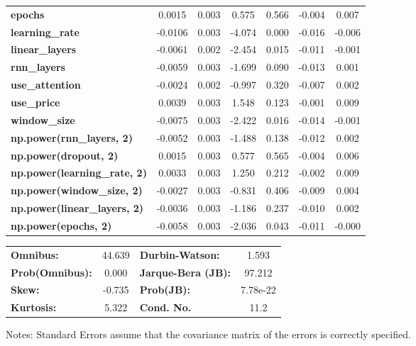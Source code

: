 \begin{center}
\begin{tabular}{lcccccc}
\textbf{epochs}                            &       0.0015  &        0.003     &     0.575  &         0.566        &       -0.004    &        0.007     \\
\textbf{learning\_rate}                    &      -0.0106  &        0.003     &    -4.074  &         0.000        &       -0.016    &       -0.006     \\
\textbf{linear\_layers}                    &      -0.0061  &        0.002     &    -2.454  &         0.015        &       -0.011    &       -0.001     \\
\textbf{rnn\_layers}                       &      -0.0059  &        0.003     &    -1.699  &         0.090        &       -0.013    &        0.001     \\
\textbf{use\_attention}                    &      -0.0024  &        0.002     &    -0.997  &         0.320        &       -0.007    &        0.002     \\
\textbf{use\_price}                        &       0.0039  &        0.003     &     1.548  &         0.123        &       -0.001    &        0.009     \\
\textbf{window\_size}                      &      -0.0075  &        0.003     &    -2.422  &         0.016        &       -0.014    &       -0.001     \\
\textbf{np.power(rnn\_layers, 2)}          &      -0.0052  &        0.003     &    -1.488  &         0.138        &       -0.012    &        0.002     \\
\textbf{np.power(dropout, 2)}              &       0.0015  &        0.003     &     0.577  &         0.565        &       -0.004    &        0.006     \\
\textbf{np.power(learning\_rate, 2)}       &       0.0033  &        0.003     &     1.250  &         0.212        &       -0.002    &        0.009     \\
\textbf{np.power(window\_size, 2)}         &      -0.0027  &        0.003     &    -0.831  &         0.406        &       -0.009    &        0.004     \\
\textbf{np.power(linear\_layers, 2)}       &      -0.0036  &        0.003     &    -1.186  &         0.237        &       -0.010    &        0.002     \\
\textbf{np.power(epochs, 2)}               &      -0.0058  &        0.003     &    -2.036  &         0.043        &       -0.011    &       -0.000     \\
\bottomrule
\end{tabular}
\begin{tabular}{lclc}
\textbf{Omnibus:}       & 44.639 & \textbf{  Durbin-Watson:     } &    1.593  \\
\textbf{Prob(Omnibus):} &  0.000 & \textbf{  Jarque-Bera (JB):  } &   97.212  \\
\textbf{Skew:}          & -0.735 & \textbf{  Prob(JB):          } & 7.78e-22  \\
\textbf{Kurtosis:}      &  5.322 & \textbf{  Cond. No.          } &     11.2  \\
\bottomrule
\end{tabular}
\end{center}

Notes: \newline
 [1] Standard Errors assume that the covariance matrix of the errors is correctly specified.